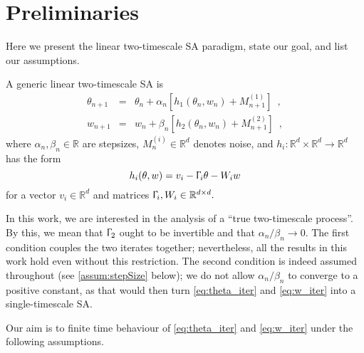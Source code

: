 \documentclass[usenames,dvipsnames,final,12pt]{colt2018} %
\newcommand{\dReal}{\mathbb{R}^d}
\newcommand{\Real}{\mathbb{R}}
\newcommand{\Mt}{M^{(1)}}
\newcommand{\st}{\alpha}
\newcommand{\Mw}{M^{(2)}}
\newcommand{\sw}{\beta}
\newcommand{\gal}[1]{#1}
\newcommand{\gugan}[1]{#1}
\begin{document}

\section{Preliminaries}
\label{sec:2TSSetup}
\gugan{Here} we present the \gugan{linear} two-timescale SA \gugan{paradigm}, state our goal, and list our assumptions.

A generic \gal{linear} two-timescale SA is
%	
\begin{eqnarray}
\theta_{n + 1} &  = & \theta_n + \st_n [h_1(\theta_n, w_n) + \Mt_{n + 1}] \enspace, \label{eq:theta_iter}\\
%
w_{n + 1} & = & w_n + \sw_n [h_2(\theta_n, w_n) + \Mw_{n + 1}] \enspace,  \label{eq:w_iter}
\end{eqnarray}
%
where $\st_n, \sw_n \in \Real$ are stepsizes, $M^{(i)}_n \in \dReal$ denotes noise, and \gugan{$h_i: \dReal \times \dReal \to \dReal$ has the form}
%
\begin{equation}
\label{eqn:lht}
h_i(\theta, w) = v_i - \Upgamma_i \theta - W_i w
\end{equation}
%
for a vector $v_i \in \dReal$ and matrices $\Upgamma_i, W_i \in \mathbb{R}^{d \times d}.$
\begin{remark} \label{rem: true 2TS}
In this work, we are interested in the analysis of a ``true two-timescale process''. By this, we mean that $\Upgamma_2$ ought to be invertible \gugan{and that $\alpha_n/\beta_n \to 0.$ The first condition couples the two iterates together; nevertheless, all the results in this work hold even without this restriction. The second condition is indeed assumed throughout (see \ref{assum:stepSize} below); we do not allow $\alpha_n/\beta_n$ to converge to a positive constant, as that would then turn \eqref{eq:theta_iter} and \eqref{eq:w_iter} into a single-timescale SA.}
\end{remark}

Our aim is to \gugan{finite time behaviour of} \eqref{eq:theta_iter} and \eqref{eq:w_iter} under the following assumptions.
\end{document}
